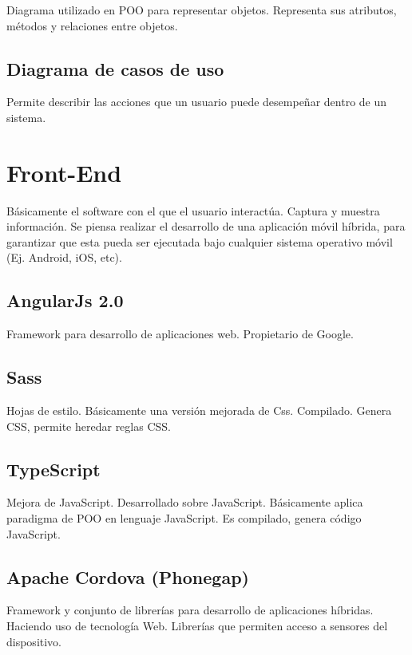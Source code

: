 Diagrama utilizado en POO para representar objetos. Representa sus atributos, métodos y relaciones entre objetos.

\subsection{Diagrama de casos de uso}

Permite describir las acciones que un usuario puede desempeñar dentro de un sistema.

\section{Front-End}

Básicamente el software con el que el usuario interactúa. Captura y muestra información. Se piensa realizar el desarrollo de una aplicación móvil híbrida, para garantizar que esta pueda ser ejecutada bajo cualquier sistema operativo móvil (Ej. Android, iOS, etc).

\subsection{AngularJs 2.0}

Framework para desarrollo de aplicaciones web. Propietario de Google.

\subsection{Sass}

Hojas de estilo. Básicamente una versión mejorada de Css. Compilado. Genera CSS, permite heredar reglas CSS.

\subsection{TypeScript}

Mejora de JavaScript. Desarrollado sobre JavaScript. Básicamente aplica paradigma de POO en lenguaje JavaScript. Es compilado, genera código JavaScript.

\subsection{Apache Cordova (Phonegap)}

Framework y conjunto de librerías para desarrollo de aplicaciones híbridas. Haciendo uso de tecnología Web. Librerías que permiten acceso a sensores del dispositivo.


